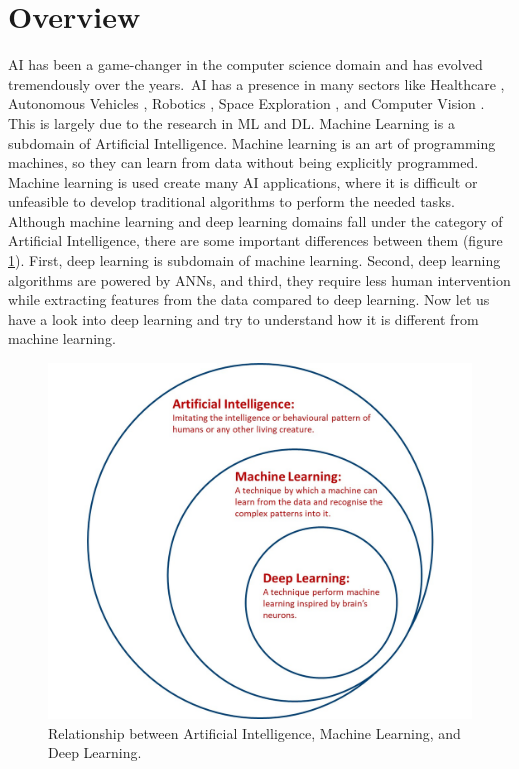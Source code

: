 \justifying
\setlength{\parskip}{1em}


\section{Overview}

\ac{AI} has been a game-changer in the computer science domain and has evolved tremendously over the years.\ \ac{AI} has a presence in many sectors like Healthcare \cite{Yu.2018}, Autonomous Vehicles \cite{Yurtsever_2020}, Robotics \cite{10.1007/978-3-642-82153-0_2}, Space Exploration \cite{Girimonte2007}, and Computer Vision \cite{2020}. This is largely due to the research in \ac{ML} and \ac{DL}. Machine Learning is a subdomain of Artificial Intelligence. Machine learning is an art of programming machines, so they can learn from data without being explicitly programmed. Machine learning is used create many \ac{AI} applications, where it is difficult or unfeasible to develop traditional algorithms to perform the needed tasks. Although machine learning and deep learning domains fall under the category of Artificial Intelligence, there are some important differences between them (figure \ref{fig:deepLearningSubset}). First, deep learning is subdomain of machine learning. Second, deep learning algorithms are powered by \acp{ANN}, and third, they require less human intervention while extracting features from the data compared to deep learning. Now let us have a look into deep learning and try to understand how it is different from machine learning.

\begin{figure}[H]
        \begin{center}
 	    \includegraphics[scale=0.25]{images/Introduction/deeplearningsubset.jpg}
	    \caption[Relationship between Artificial Intelligence, Machine Learning, and Deep Learning.]{Relationship between Artificial Intelligence, Machine Learning, and Deep Learning.}
	    \label{fig:deepLearningSubset}
	    \end{center}
\end{figure}


